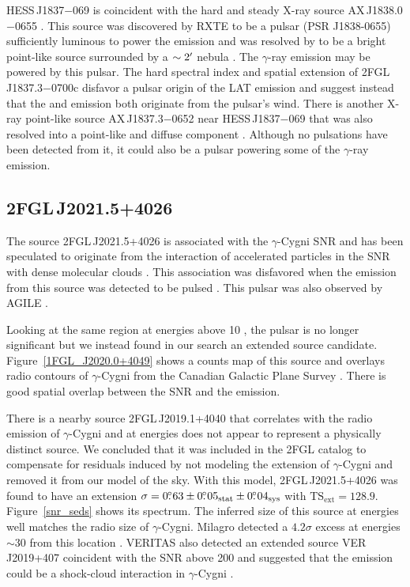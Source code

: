 \documentclass[12pt,preprint]{aastex}
\newcommand{\gev}{\text{GeV}\xspace}
\newcommand{\tev}{\text{TeV}\xspace}
\newcommand{\tsext}{{\ensuremath{\text{TS}_{\text{ext}}}}\xspace}
\newcommand{\chandra}{\text{{\em Chandra}}\xspace}
\newcommand{\sys}{\text{sys}\xspace}
\newcommand{\stat}{\text{stat}\xspace}
\begin{document}
HESS\,J1837$-$069 is coincident with the hard and steady X-ray source
AX\,J1838.0$-$0655 \citep{hard_x-ray_asca}.  This source was discovered
by RXTE to be a pulsar (PSR J1838-0655) 
sufficiently luminous to power the \tev emission
and was resolved by \chandra to be a bright point-like source surrounded
by a $\sim2\mbox{$^\prime$}$ nebula \citep{pulsations_HESS_J1837-069}. The
$\gamma$-ray emission may be powered by this pulsar.  The hard spectral
index and spatial extension of 2FGL\,J1837.3$-$0700c disfavor a pulsar
origin of the LAT emission and suggest instead that the \gev and \tev
emission both originate from the pulsar's wind.  There is another
X-ray point-like source AX\,J1837.3$-$0652 near HESS\,J1837$-$069
\citep{hard_x-ray_asca} that was also resolved into a point-like
and diffuse component \citep{pulsations_HESS_J1837-069}.  Although no
pulsations have been detected from it, it could also be a pulsar powering
some of the $\gamma$-ray emission.


\subsection{2FGL\,J2021.5+4026}
\label{section_2FGL J2021.5+4026}





The source 2FGL\,J2021.5+4026 is associated with the $\gamma$-Cygni SNR 
and has been speculated
to originate from the interaction of accelerated particles in the SNR
with dense molecular clouds \citep{pollock_1985,gaisser_1998}. This
association was disfavored when the \gev emission from this source
was detected to be pulsed \citep[PSR\,J2021+4026,][]{first_lat_pulsar_cat}.
This pulsar was also observed by AGILE \citep{gamma_cygni_agile}.

Looking at the same region at energies above 10 \gev, the pulsar is
no longer significant but we instead found in our search an extended
source candidate.  Figure~\ref{1FGL_J2020.0+4049} shows a counts map
of this source and overlays radio contours of $\gamma$-Cygni from the
Canadian Galactic Plane Survey \citep{canadian_galactic_plane_survey}.
There is good spatial overlap between the SNR and the \gev emission.

There is a nearby source 2FGL\,J2019.1+4040 that correlates with the radio
emission of $\gamma$-Cygni and at \gev energies 
does not appear to represent a physically
distinct source.  We concluded that it was included in the 2FGL catalog to compensate
for residuals induced by not modeling the extension of $\gamma$-Cygni and
removed it from our model of the sky.  With this model, 2FGL\,J2021.5+4026
was found to have an extension $\sigma=0\fdg63\pm0\fdg05_\stat\pm0\fdg04_\sys$
with $\tsext=128.9$.  Figure~\ref{snr_seds}
shows its spectrum.  The inferred size of this source at \gev energies
well matches the radio size of $\gamma$-Cygni.  Milagro detected
a $4.2\sigma$ excess at energies $\sim 30$ \tev from this location
\citep{lat_bsl,milagro_bright_source_list}.  VERITAS also detected an
extended source VER\,J2019+407 coincident with the SNR above 200 \gev
and suggested that the \tev emission could be a shock-cloud interaction
in $\gamma$-Cygni \citep{veritas_gamma_cygni}.
\end{document}
